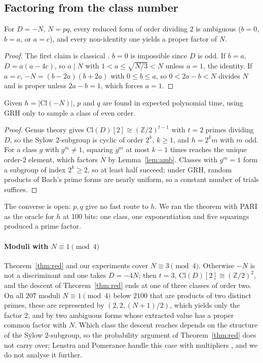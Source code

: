 \documentclass[runningheads]{llncs}
\newcommand{\Cl}{\mathrm{Cl}}
\newcommand{\Z}{\mathbb{Z}}
\begin{document}
\subsection{Factoring from the class number}
\begin{lemma}\label{lem:amb}
For $D=-N$, $N=pq$, every reduced form of order dividing $2$ is ambiguous ($b=0$, $b=a$, or $a=c$), and every non-identity one yields a proper factor of $N$.
\end{lemma}
\begin{proof}
The first claim is classical \cite{cohen1993}. $b=0$ is impossible since $D$ is odd. If $b=a$, $D=a(a-4c)$, so $a\mid N$ with $1<a\le\sqrt{N/3}<N$ unless $a=1$, the identity. If $a=c$, $-N=(b-2a)(b+2a)$ with $0\le b\le a$, so $0<2a-b<N$ divides $N$ and is proper unless $2a-b=1$, which forces $a=1$.
\end{proof}
\begin{theorem}\label{thm:red}
Given $h=|\Cl(-N)|$, $p$ and $q$ are found in expected polynomial time, using GRH only to sample a class of even order.
\end{theorem}
\begin{proof}
Genus theory gives $\Cl(D)[2]\cong(\Z/2)^{t-1}$ with $t=2$ primes dividing $D$, so the Sylow $2$-subgroup is cyclic of order $2^k$, $k\ge1$, and $h=2^km$ with $m$ odd. For a class $g$ with $g^m\ne1$, squaring $g^m$ at most $k-1$ times reaches the unique order-$2$ element, which factors $N$ by Lemma~\ref{lem:amb}. Classes with $g^m=1$ form a subgroup of index $2^k\ge2$, so at least half succeed; under GRH, random products of Bach's prime forms are nearly uniform, so a constant number of trials suffices.
\end{proof}
The converse is open: $p,q$ give no fast route to $h$. We ran the theorem with PARI \cite{pari} as the oracle for $h$ at 100 bits: one class, one exponentiation and five squarings produced a prime factor.

\paragraph{Moduli with $N\equiv1\pmod4$} Theorem~\ref{thm:red} and our experiments cover $N\equiv3\pmod4$. Otherwise $-N$ is not a discriminant and one takes $D=-4N$; then $t=3$, $\Cl(D)[2]\cong(\Z/2)^2$, and the descent of Theorem~\ref{thm:red} ends at one of three classes of order two. On all $207$ moduli $N\equiv1\pmod4$ below $2100$ that are products of two distinct primes, these are represented by $(2,2,(N+1)/2)$, which yields only the factor $2$, and by two ambiguous forms whose extracted value has a proper common factor with $N$. Which class the descent reaches depends on the structure of the Sylow $2$-subgroup, so the probability argument of Theorem~\ref{thm:red} does not carry over; Lenstra and Pomerance handle this case with multipliers \cite{lenstra1992}, and we do not analyse it further.
\end{document}
